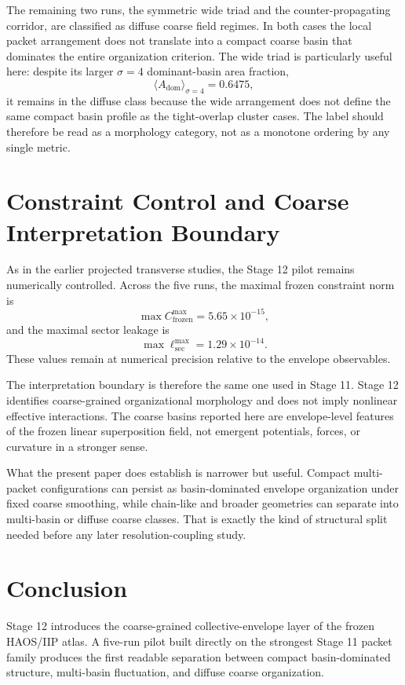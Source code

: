 \documentclass[11pt]{article}
\begin{document}
The remaining two runs, the symmetric wide triad and the counter-propagating corridor, are classified as diffuse coarse field regimes. In both cases the local packet arrangement does not translate into a compact coarse basin that dominates the entire organization criterion. The wide triad is particularly useful here: despite its larger $\sigma=4$ dominant-basin area fraction,
\begin{equation}
\langle A_{\mathrm{dom}}\rangle_{\sigma=4} = 0.6475,
\end{equation}
it remains in the diffuse class because the wide arrangement does not define the same compact basin profile as the tight-overlap cluster cases. The label should therefore be read as a morphology category, not as a monotone ordering by any single metric.

\section{Constraint Control and Coarse Interpretation Boundary}
As in the earlier projected transverse studies, the Stage 12 pilot remains numerically controlled. Across the five runs, the maximal frozen constraint norm is
\begin{equation}
\max C^{\max}_{\mathrm{frozen}} = 5.65\times 10^{-15},
\end{equation}
and the maximal sector leakage is
\begin{equation}
\max \ell^{\max}_{\mathrm{sec}} = 1.29\times 10^{-14}.
\end{equation}
These values remain at numerical precision relative to the envelope observables.

The interpretation boundary is therefore the same one used in Stage 11. Stage 12 identifies coarse-grained organizational morphology and does not imply nonlinear effective interactions. The coarse basins reported here are envelope-level features of the frozen linear superposition field, not emergent potentials, forces, or curvature in a stronger sense.

What the present paper does establish is narrower but useful. Compact multi-packet configurations can persist as basin-dominated envelope organization under fixed coarse smoothing, while chain-like and broader geometries can separate into multi-basin or diffuse coarse classes. That is exactly the kind of structural split needed before any later resolution-coupling study.

\section{Conclusion}
Stage 12 introduces the coarse-grained collective-envelope layer of the frozen HAOS/IIP atlas. A five-run pilot built directly on the strongest Stage 11 packet family produces the first readable separation between compact basin-dominated structure, multi-basin fluctuation, and diffuse coarse organization.
\end{document}
